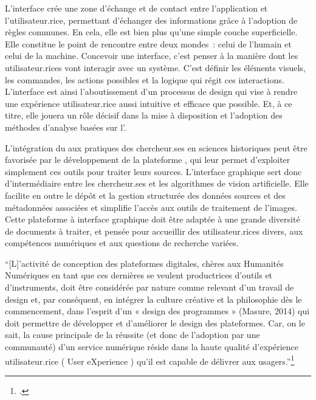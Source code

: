 L'interface crée une zone d'échange et de contact entre l'application et l'utilisateur.rice, permettant d'échanger des informations grâce à l'adoption de règles communes. En cela, elle est bien plus qu'une simple couche superficielle. Elle
constitue le point de rencontre entre deux mondes~: celui de l'humain et
celui de la machine. Concevoir une interface, c'est penser à la manière
dont les utilisateur.rices vont interagir avec un système. C'est définir les
éléments visuels, les commandes, les actions possibles et la logique qui
régit ces interactions. L'interface est ainsi l'aboutissement d'un
processus de design qui vise à rendre une expérience utilisateur.rice aussi
intuitive et efficace que possible. Et, à ce titre, elle jouera un rôle
décisif dans la mise à disposition et l'adoption des méthodes d'analyse
basées sur l'\ia.

L'intégration du \dl aux pratiques des chercheur.ses en sciences
historiques peut être favorisée par le développement de la plateforme \aikon, qui leur
permet d'exploiter simplement ces outils pour traiter leurs sources.
L'interface graphique sert donc d'intermédiaire entre les chercheur.ses et les
algorithmes de vision artificielle. Elle facilite en outre le dépôt et
la gestion structurée des données sources et des métadonnées associées
et simplifie l'accès aux outils de traitement de l'images. Cette
plateforme à interface graphique doit être adaptée à une grande
diversité de documents à traiter, et pensée pour accueillir des
utilisateur.rices divers, aux compétences numériques et aux questions de
recherche variées.

\begin{kwote}
``{[}L{]}'activité de conception des plateformes digitales, chères aux
Humanités Numériques en tant que ces dernières se veulent productrices
d'outils et d'instruments, doit être considérée par nature comme
relevant d'un travail de design et, par conséquent, en intégrer la
culture créative et la philosophie dès le commencement, dans l'esprit
d'un « design des programmes » (Masure, 2014) qui doit permettre de
développer et d'améliorer le design des plateformes. Car, on le sait,
la cause principale de la réussite (et donc de l'adoption par une
communauté) d'un service numérique réside dans la haute qualité
d'expérience utilisateur.rice ( User eXperience ) qu'il est capable de
délivrer aux usagers.''\footcite{clavert_2dh_2015}
\end{kwote}

